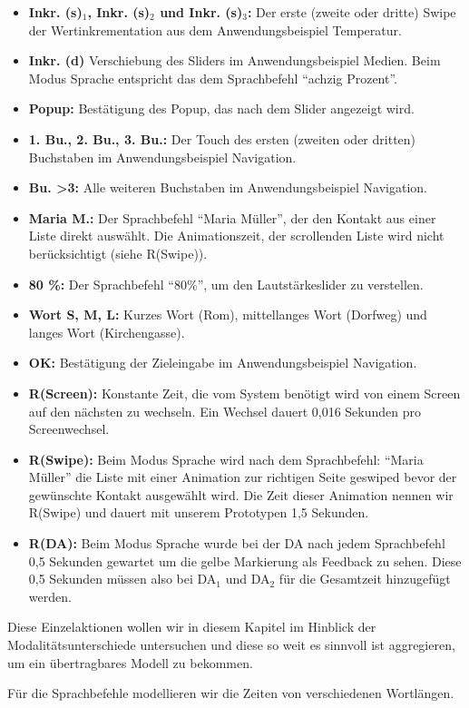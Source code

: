 \begin{itemize}
	\item \textbf{Inkr. (s)$_1$, Inkr. (s)$_2$ und Inkr. (s)$_3$:} Der erste (zweite oder dritte) Swipe der Wertinkrementation aus dem Anwendungsbeispiel Temperatur. 
	\item \textbf{Inkr. (d)} Verschiebung des Sliders im Anwendungsbeispiel Medien. Beim Modus Sprache entspricht das dem Sprachbefehl "`achzig Prozent"'.
	\item \textbf{Popup:} Bestätigung des Popup, das nach dem Slider angezeigt wird.
	\item \textbf{1. Bu., 2. Bu., 3. Bu.:} Der Touch des ersten (zweiten oder dritten) Buchstaben im Anwendungsbeispiel Navigation. 
	\item \textbf{Bu. >3:} Alle weiteren Buchstaben im Anwendungsbeispiel Navigation.
		\item \textbf{Maria M.:} Der Sprachbefehl "`Maria Müller"', der den Kontakt aus einer Liste direkt auswählt. Die Animationszeit, der scrollenden Liste wird nicht berücksichtigt (siehe R(Swipe)). 
		\item \textbf{80 \%:} Der Sprachbefehl "`80\%"', um den Lautstärkeslider zu verstellen.
	\item \textbf{Wort S, M, L:} Kurzes Wort (Rom), mittellanges Wort (Dorfweg) und langes Wort (Kirchengasse).
	\item \textbf{OK:} Bestätigung der Zieleingabe im Anwendungsbeispiel Navigation. 
	\item \textbf{R(Screen):} Konstante Zeit, die vom System benötigt wird von einem Screen auf den nächsten zu wechseln. Ein Wechsel dauert 0,016 Sekunden pro Screenwechsel.
	\item \textbf{R(Swipe):} Beim Modus Sprache wird nach dem Sprachbefehl: "`Maria Müller"' die Liste mit einer Animation zur richtigen Seite geswiped bevor der gewünschte Kontakt ausgewählt wird. Die Zeit dieser Animation nennen wir R(Swipe) und dauert mit unserem Prototypen 1,5 Sekunden.
	\item \textbf{R(DA):} Beim Modus Sprache wurde bei der DA nach jedem Sprachbefehl 0,5 Sekunden gewartet um die gelbe Markierung als Feedback zu sehen. Diese 0,5 Sekunden müssen also bei DA$_1$ und DA$_2$ für die Gesamtzeit hinzugefügt werden.
\end{itemize}
Diese Einzelaktionen wollen wir in diesem Kapitel im Hinblick der Modalitätsunterschiede untersuchen und diese so weit es sinnvoll ist aggregieren, um ein übertragbares Modell zu bekommen.

Für die Sprachbefehle modellieren wir die Zeiten von verschiedenen Wortlängen. 

